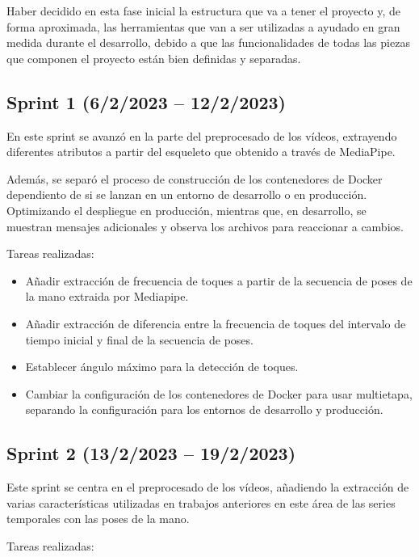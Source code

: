 Haber decidido en esta fase inicial la estructura que va a tener el proyecto y,
de forma aproximada, las herramientas que van a ser utilizadas a ayudado en gran
medida durante el desarrollo, debido a que las funcionalidades de todas las
piezas que componen el proyecto están bien definidas y separadas.

\subsection{Sprint 1 (6/2/2023 -- 12/2/2023)}

En este sprint se avanzó en la parte del preprocesado de los vídeos, extrayendo
diferentes atributos a partir del esqueleto que obtenido a través de MediaPipe.

Además, se separó el proceso de construcción de los contenedores de Docker
dependiento de si se lanzan en un entorno de desarrollo o en producción.
Optimizando el despliegue en producción, mientras que, en desarrollo, se
muestran mensajes adicionales y observa los archivos para reaccionar a cambios.

Tareas realizadas:

\begin{itemize}
    \item Añadir extracción de frecuencia de toques a partir de la secuencia de
          poses de la mano extraida por Mediapipe.
    \item Añadir extracción de diferencia entre la frecuencia de toques del
          intervalo de tiempo inicial y final de la secuencia de poses.
    \item Establecer ángulo máximo para la detección de toques.
    \item Cambiar la configuración de los contenedores de Docker para usar
          multietapa, separando la configuración para los entornos de desarrollo
          y producción.
\end{itemize}

\subsection{Sprint 2 (13/2/2023 -- 19/2/2023)}

Este sprint se centra en el preprocesado de los vídeos, añadiendo la extracción
de varias características utilizadas en trabajos anteriores en este área de las
series temporales con las poses de la mano.

Tareas realizadas:

